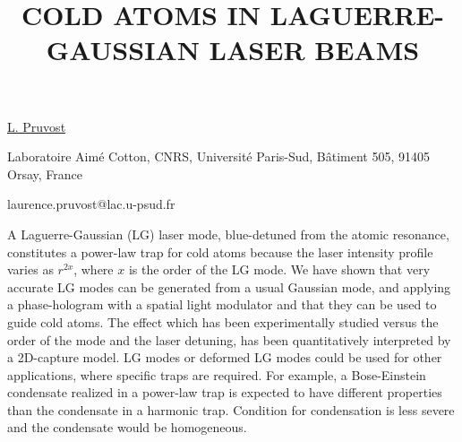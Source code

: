\title{COLD ATOMS IN LAGUERRE-GAUSSIAN LASER BEAMS}

\underline{L. Pruvost}

{\normalsize{
\vspace{-4mm}
Laboratoire Aim\'e Cotton, CNRS, Universit\'e Paris-Sud, B\^atiment 505, 91405 Orsay, France

\email laurence.pruvost@lac.u-psud.fr}}

A Laguerre-Gaussian (LG) laser mode, blue-detuned from the atomic resonance, constitutes a power-law trap for cold atoms because the laser intensity profile varies as $r^{2x}$, where $x$ is the order of the LG mode.
We have shown that very accurate LG modes can be generated from a usual Gaussian mode, and applying a phase-hologram with a spatial light modulator and that they can be used to guide cold atoms. The effect which has been experimentally studied versus the order of the mode and the laser detuning, has been quantitatively interpreted by a 2D-capture model.
LG modes or deformed LG modes could be used for other applications, where specific traps are required. For example, a Bose-Einstein condensate realized in a power-law trap is expected to have different properties than the condensate in a harmonic trap. Condition for condensation is less severe and the condensate would be homogeneous.

\vspace{\baselineskip} 